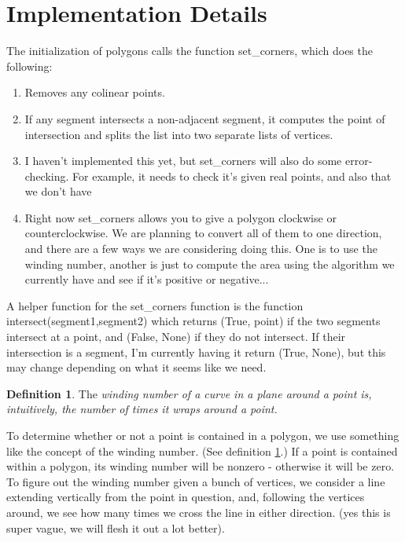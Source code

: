\documentclass[psamsfonts]{amsart}
\theoremstyle{definition}
\newtheorem{defn}[thm]{Definition}
\theoremstyle{remark}
\numberwithin{equation}{section}
\begin{document}
\section{Implementation Details}
The initialization of polygons calls the function set\_corners, which does the following:
\begin{enumerate}
\item{Removes any colinear points.}
\item{If any segment intersects a non-adjacent segment, it computes the point of intersection and splits the list into two separate lists of vertices.}
\item{I haven't implemented this yet, but set\_corners will also do some error-checking. For example, it needs to check it's given real points, and also that we don't have }
\item{Right now set\_corners allows you to give a polygon clockwise or counterclockwise. We are planning to convert all of them to one direction, and there are a few ways we are considering doing this. One is to use the winding number, another is just to compute the area using the algorithm we currently have and see if it's positive or negative...} 
\end{enumerate}

A helper function for the set\_corners function is the function intersect(segment1,segment2) which returns (True, point) if the two segments intersect at a point, and (False, None) if they do not intersect.
If their intersection is a segment, I'm currently having it return (True, None), but this may change depending on what it seems like we need.

\begin{defn} \label{def1} The \it winding number \rm of a curve in a plane around a point is, intuitively, the number of times it wraps around a point.

\end{defn}

To determine whether or not a point is contained in a polygon, we use something like the concept of the winding number. (See definition \ref{def1}.) If a point is contained within a polygon, its winding number will be nonzero - otherwise it will be zero. To figure out the winding number given a bunch of vertices, we consider a line extending vertically from the point in question, and, following the vertices around, we see how many times we cross the line in either direction.
(yes this is super vague, we will flesh it out a lot better).
\end{document}

